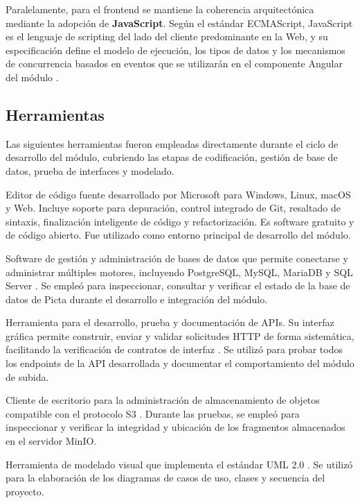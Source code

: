 Paralelamente, para el frontend se mantiene la coherencia arquitectónica mediante la adopción de
\textbf{JavaScript}. Según el estándar ECMAScript, JavaScript es el lenguaje de scripting del lado
del cliente predominante en la Web, y su especificación define el modelo de ejecución, los tipos
de datos y los mecanismos de concurrencia basados en eventos que se utilizarán en el componente
Angular del módulo \citep{Ecma2023}.

\subsection{Herramientas}

Las siguientes herramientas fueron empleadas directamente durante el ciclo de desarrollo del módulo,
cubriendo las etapas de codificación, gestión de base de datos, prueba de interfaces y modelado.

\begin{description}
\sloppy
  \item[Visual Studio Code v1.106.2:] Editor de código fuente desarrollado por Microsoft para
  Windows, Linux, macOS y Web. Incluye soporte para depuración, control integrado de Git, resaltado
  de sintaxis, finalización inteligente de código y refactorización. Es software gratuito y de
  código abierto. Fue utilizado como entorno principal de desarrollo del módulo.

  \item[Navicat Premium v17.1.10:] Software de gestión y administración de bases de datos que
  permite conectarse y administrar múltiples motores, incluyendo PostgreSQL, MySQL, MariaDB y
  SQL Server \citep{Sommerville2015}. Se empleó para inspeccionar, consultar y verificar el estado
  de la base de datos de Picta durante el desarrollo e integración del módulo.

  \item[Postman v11.73.3:] Herramienta para el desarrollo, prueba y documentación de APIs. Su
  interfaz gráfica permite construir, enviar y validar solicitudes HTTP de forma sistemática,
  facilitando la verificación de contratos de interfaz \citep{Lutz2013}. Se utilizó para probar
  todos los endpoints de la API desarrollada y documentar el comportamiento del módulo de subida.

  \item[S3 Browser v12.9.9:] Cliente de escritorio para la administración de almacenamiento de
  objetos compatible con el protocolo S3 \citep{AWS2023}. Durante las pruebas, se empleó para
  inspeccionar y verificar la integridad y ubicación de los fragmentos almacenados en el servidor
  MinIO.

  \item[Visual Paradigm v17.0:] Herramienta de modelado visual que implementa el estándar UML 2.0
  \citep{Miles2006}. Se utilizó para la elaboración de los diagramas de casos de uso, clases y
  secuencia del proyecto.
\end{description}

